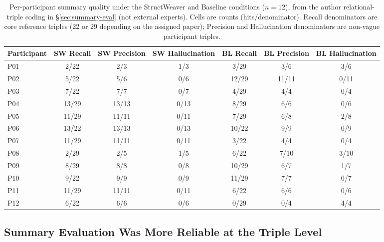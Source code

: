 \documentclass[manuscript,review,anonymous]{acmart}
\begin{document}
\begin{table}[t]
\centering
\caption{Per-participant summary quality under the StructWeaver and Baseline conditions ($n=12$), from the author relational-triple coding in \S\ref{sec:summary-eval} (not external experts). Cells are counts (hits/denominator). Recall denominators are core reference triples (22 or 29 depending on the assigned paper); Precision and Hallucination denominators are non-vague participant triples.}
\label{tab:summary_quality}
\footnotesize
\setlength{\tabcolsep}{4pt}
\begin{tabular}{lcccccc}
\toprule
Participant & SW Recall & SW Precision & SW Hallucination & BL Recall & BL Precision & BL Hallucination \\
\midrule
P01 & 2/22 & 2/3 & 1/3 & 3/29 & 3/6 & 3/6 \\
P02 & 5/22 & 5/6 & 0/6 & 12/29 & 11/11 & 0/11 \\
P03 & 7/22 & 7/7 & 0/7 & 4/29 & 4/4 & 0/4 \\
P04 & 13/29 & 13/13 & 0/13 & 8/29 & 6/6 & 0/6 \\
P05 & 11/29 & 11/11 & 0/11 & 7/29 & 6/8 & 2/8 \\
P06 & 13/22 & 13/13 & 0/13 & 10/22 & 9/9 & 0/9 \\
P07 & 11/29 & 11/11 & 0/11 & 3/22 & 4/4 & 0/4 \\
P08 & 2/29 & 2/5 & 1/5 & 6/22 & 7/10 & 3/10 \\
P09 & 8/29 & 8/8 & 0/8 & 10/29 & 6/7 & 1/7 \\
P10 & 9/22 & 9/9 & 0/9 & 11/29 & 7/7 & 0/7 \\
P11 & 11/29 & 11/11 & 0/11 & 6/22 & 6/6 & 0/6 \\
P12 & 6/22 & 6/6 & 0/6 & 0/29 & 0/4 & 4/4 \\
\bottomrule
\end{tabular}
\end{table}

\subsection{Summary Evaluation Was More Reliable at the Triple Level}
\end{document}
